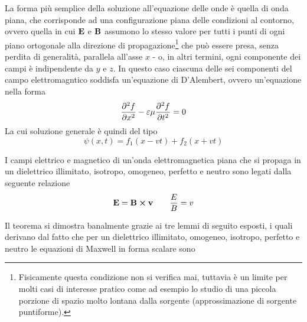 La forma più semplice della soluzione all'equazione delle onde è quella di onda piana, che corrisponde ad una configurazione piana
delle condizioni al contorno,
ovvero quella in cui $\vb{E}$ e $\vb{B}$ assumono lo stesso valore per tutti i punti di ogni piano ortogonale alla
direzione di propagazione\footnote{Fisicamente questa condizione non si verifica mai, tuttavia è un limite per molti
casi di interesse pratico come ad esempio lo studio di una piccola porzione di spazio molto lontana dalla sorgente
(approssimazione di sorgente puntiforme).}
che può essere presa, senza perdita di generalità, parallela all'asse $x$ - o,
in altri termini, ogni componente dei campi è indipendente da $y$ e $z$. In questo caso ciascuna delle
sei componenti del campo elettromagntico soddisfa un'equazione di D'Alembert, ovvero un'equazione nella forma
\[
    \pdv[2]{f}{x}-\varepsilon\mu\pdv[2]{f}{t}=0
\]
La cui soluzione generale è quindi del tipo
\begin{equation}
    \psi(x,t)=f_1(x-vt)+f_2(x+vt)
\end{equation}

\begin{thm}
    I campi elettrico e magnetico di un'onda elettromagnetica piana che si propaga in un dielettrico illimitato, isotropo, omogeneo,
    perfetto e neutro sono legati dalla seguente relazione
    \[
        \vb{E}=\vb{B}\cp\vb{v}\quad\quad \frac{E}{B}=v
    \]
\end{thm}
Il teorema si dimostra banalmente grazie ai tre lemmi di seguito esposti, i quali derivano dal fatto che
per un dielettrico illimitato, omogeneo, isotropo, perfetto e neutro
le equazioni di Maxwell in forma scalare sono

